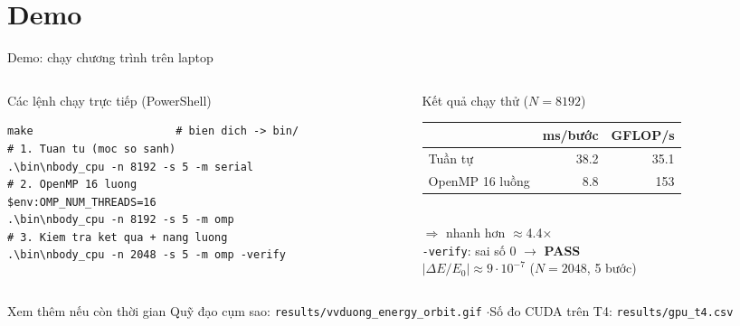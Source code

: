 \documentclass[aspectratio=169,11pt]{beamer}
\newcommand{\nguoi}{}
\newcommand{\nguoinoi}[1]{\renewcommand{\nguoi}{#1}}
\newcommand{\code}[1]{\texttt{\color{navy}#1}}
\begin{document}
\section{Demo}
\nguoinoi{Trình bày: Nguyễn Quốc Doanh}

\begin{frame}[fragile]{Demo: chạy chương trình trên laptop}
\begin{columns}[T]
\begin{column}{0.55\textwidth}
\begin{block}{Các lệnh chạy trực tiếp (PowerShell)}
\footnotesize
\begin{verbatim}
make                      # bien dich -> bin/
# 1. Tuan tu (moc so sanh)
.\bin\nbody_cpu -n 8192 -s 5 -m serial
# 2. OpenMP 16 luong
$env:OMP_NUM_THREADS=16
.\bin\nbody_cpu -n 8192 -s 5 -m omp
# 3. Kiem tra ket qua + nang luong
.\bin\nbody_cpu -n 2048 -s 5 -m omp -verify
\end{verbatim}
\end{block}
\end{column}
\begin{column}{0.42\textwidth}
\begin{block}{Kết quả chạy thử ($N=8192$)}
\small
\setlength{\tabcolsep}{4pt}
\begin{tabular}{lrr}
\toprule
 & ms/bước & GFLOP/s \\
\midrule
Tuần tự & 38.2 & 35.1 \\
OpenMP 16 luồng & 8.8 & 153 \\
\bottomrule
\end{tabular}\\[5pt]
$\Rightarrow$ nhanh hơn \alert{$\approx$4.4×}\\[4pt]
\code{-verify}: sai số \alert{0} $\to$ \textbf{PASS}\\
$|\Delta E/E_0|\approx 9\cdot10^{-7}$ ($N=2048$, 5 bước)
\end{block}
\end{column}
\end{columns}
\vspace{4pt}
\begin{block}{Xem thêm nếu còn thời gian}
\small
Quỹ đạo cụm sao: \code{results/vvduong\_energy\_orbit.gif} \quad$\cdot$\quad Số đo CUDA trên T4: \code{results/gpu\_t4.csv}
\end{block}
\end{frame}
\end{document}
